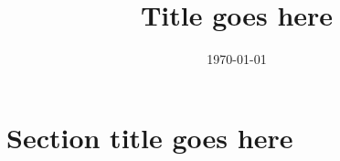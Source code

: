 \documentclass[final,letterpaper,twoside,12pt]{article}
\title{Title goes here}
\date{\today}
\begin{document}
\maketitle

\section{Section title goes here}
\label{section:setion_tag}


\end{document}
